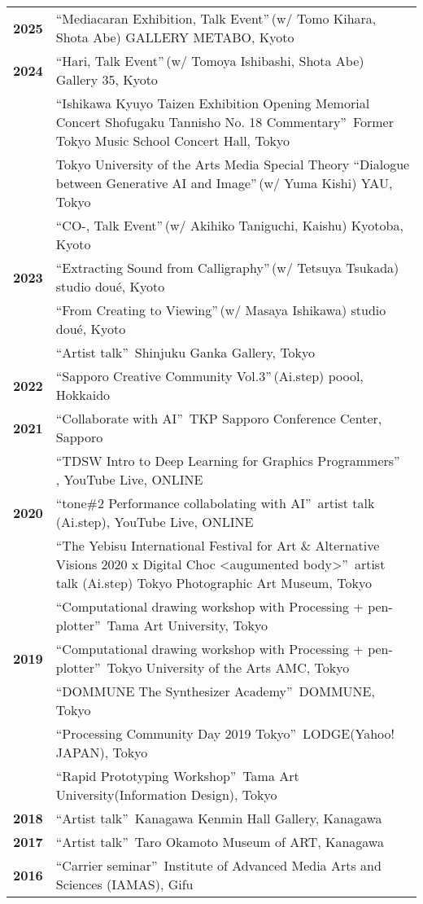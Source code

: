 \documentclass[8pt,a4paper]{article}
\begin{document}
\begin{tabular}{@{}p{1.2cm}@{\hspace{0.5cm}}p{14cm}@{}}
\textbf{2025} & ``Mediacaran Exhibition, Talk Event''\,(w/ Tomo Kihara, Shota Abe) GALLERY METABO, Kyoto \\[0.2em]
\textbf{2024} & ``Hari, Talk Event''\,(w/ Tomoya Ishibashi, Shota Abe) Gallery 35, Kyoto \\
& ``Ishikawa Kyuyo Taizen Exhibition Opening Memorial Concert Shofugaku Tannisho No. 18 Commentary''\, Former Tokyo Music School Concert Hall, Tokyo \\
& Tokyo University of the Arts Media Special Theory ``Dialogue between Generative AI and Image''\,(w/ Yuma Kishi) YAU, Tokyo \\
& ``CO-, Talk Event''\,(w/ Akihiko Taniguchi, Kaishu) Kyotoba, Kyoto \\[0.2em]
\textbf{2023} & ``Extracting Sound from Calligraphy''\,(w/ Tetsuya Tsukada) studio doué, Kyoto \\
& ``From Creating to Viewing''\,(w/ Masaya Ishikawa) studio doué, Kyoto \\
& ``Artist talk''\, Shinjuku Ganka Gallery, Tokyo \\[0.2em]
\textbf{2022} & ``Sapporo Creative Community Vol.3''\,(Ai.step) poool, Hokkaido \\[0.2em]
\textbf{2021} & ``Collaborate with AI''\, TKP Sapporo Conference Center, Sapporo \\
& ``TDSW Intro to Deep Learning for Graphics Programmers''\, , YouTube Live, ONLINE \\[0.2em]
\textbf{2020} & ``tone\#2 Performance collabolating with AI''\, artist talk (Ai.step), YouTube Live, ONLINE \\
& ``The Yebisu International Festival for Art \& Alternative Visions 2020 x Digital Choc <augumented body>''\, artist talk (Ai.step) Tokyo Photographic Art Museum, Tokyo \\
& ``Computational drawing workshop with Processing + pen-plotter''\, Tama Art University, Tokyo \\[0.2em]
\textbf{2019} & ``Computational drawing workshop with Processing + pen-plotter''\, Tokyo University of the Arts AMC, Tokyo \\
& ``DOMMUNE The Synthesizer Academy''\, DOMMUNE, Tokyo \\
& ``Processing Community Day 2019 Tokyo''\, LODGE(Yahoo! JAPAN), Tokyo \\
& ``Rapid Prototyping Workshop''\, Tama Art University(Information Design), Tokyo \\[0.2em]
\textbf{2018} & ``Artist talk''\, Kanagawa Kenmin Hall Gallery, Kanagawa \\[0.2em]
\textbf{2017} & ``Artist talk''\, Taro Okamoto Museum of ART, Kanagawa \\[0.2em]
\textbf{2016} & ``Carrier seminar''\, Institute of Advanced Media Arts and Sciences (IAMAS), Gifu \\
\end{tabular}
\end{document}
